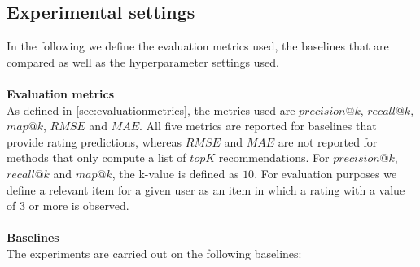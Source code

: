 \subsection{Experimental settings}
In the following we define the evaluation metrics used, the baselines that are compared as well as the hyperparameter settings used.
\\\\
\textbf{Evaluation metrics}\\
As defined in \autoref{sec:evaluationmetrics}, the metrics used are $precision@k$, $recall@k$, $map@k$, $RMSE$ and $MAE$.
All five metrics are reported for baselines that provide rating predictions, whereas $RMSE$ and $MAE$ are not reported for methods that only compute a list of $topK$ recommendations.
For $precision@k$, $recall@k$ and $map@k$, the k-value is defined as $10$.
For evaluation purposes we define a relevant item for a given user as an item in which a rating with a value of $3$ or more is observed. 
\\\\
\textbf{Baselines}\\
The experiments are carried out on the following baselines:
